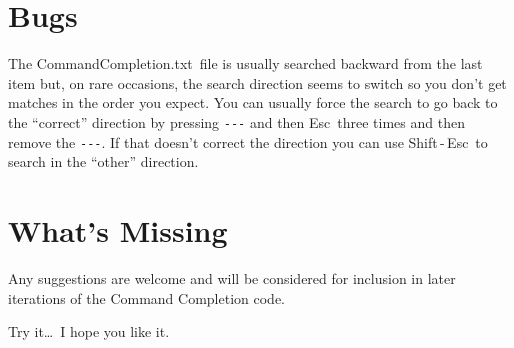 \documentclass[11pt]{article}
\newcommand{\esckey}{\textsf{Esc}}
\newcommand{\shiftkey}{\textsf{Shift}}
\newcommand{\CCT}{\textsf{CommandCompletion.txt}}
\begin{document}
\section*{Bugs}

The \CCT\ file is usually searched backward from the last item but, on rare occasions, the search direction seems to switch so you don't get matches in the order you expect. You can usually force the search to go back to the ``correct'' direction by pressing \verb+---+ and then \esckey\ three times and then remove the \verb+---+. If that doesn't correct the direction you can use \shiftkey\,-\,\esckey\ to search in the ``other'' direction.

\section*{What's Missing}

Any suggestions are welcome and will be considered for inclusion in later iterations of the Command Completion code.

\vspace{5pt plus 2pt minus 1pt}\noindent
Try it\dots\ I hope you like it.

\end{document}
